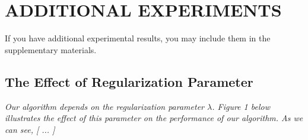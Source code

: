 \documentclass[twoside]{article}
\begin{document}
\section{ADDITIONAL EXPERIMENTS}

If you have additional experimental results, you may include them in the supplementary materials.

\subsection{The Effect of Regularization Parameter}

\textit{Our algorithm depends on the regularization parameter $\lambda$. Figure 1 below illustrates the effect of this parameter on the performance of our algorithm. As we can see, [ ... ]}

\vfill
\end{document}
